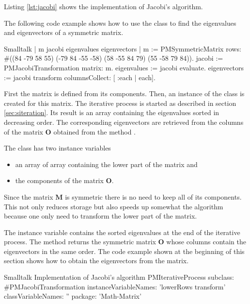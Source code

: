 Listing \ref{lst:jacobi} shows the implementation of Jacobi's algorithm.

The following code example shows how to use the class to find the
eigenvalues and eigenvectors of a symmetric matrix.
\begin{displaycode}{Smalltalk}
 | m jacobi eigenvalues eigenvectors |
 m := PMSymmetricMatrix rows: #((84 -79 58 55)
                                 (-79 84 -55 -58)
                                 (58 -55 84 79)
                                 (55 -58 79 84)).
 jacobi := PMJacobiTransformation matrix: m.
 eigenvalues := jacobi evaluate.
 eigenvectors := jacobi transform columnsCollect: [ :each | each].
\end{displaycode}
First the matrix  is defined from its components. Then, an
instance of the class  is created for
this matrix. The iterative process is started as described in
section \ref{sec:siteration}. Its result is an array containing
the eigenvalues sorted in decreasing order. The corresponding
eigenvectors are retrieved from the columns of the matrix $\textbf{O}$ obtained from the method .

The class  has two instance variables
\begin{itemize}
  \item {} an array of array containing the lower part
  of the matrix and
  \item {} the components of the matrix $\textbf{O}$.
\end{itemize}
Since the matrix $\textbf{M}$ is symmetric there is no need to keep
all of its components. This not only reduces storage but also
speeds up somewhat the algorithm because one only need to
transform the lower part of the matrix.

The instance variable  contains the sorted eigenvalues
at the end of the iterative process. The method 
returns the symmetric matrix ${\textbf{O}}$ whose columns contain the
eigenvectors in the same order. The code example shown at the
beginning of this section shows how to obtain the eigenvectors
from the matrix.

\begin{listing}[label=lst:jacobi]{Smalltalk}
{Implementation of Jacobi's algorithm}
PMIterativeProcess subclass: #PMJacobiTransformation
   instanceVariableNames: 'lowerRows transform'
   classVariableNames: ''
   package: 'Math-Matrix'
\end{listing}

